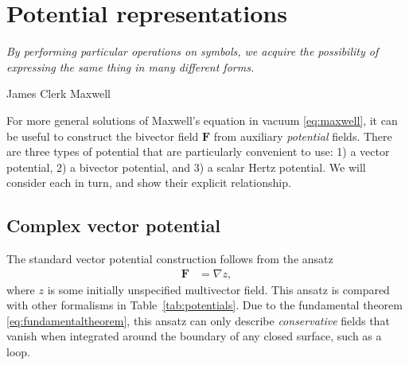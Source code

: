 \documentclass[1p,sort&compress]{elsarticle}
\numberwithin{equation}{section}
\newcommand{\bv}[1]{\mathbf{#1}}
\newcommand\epigraph[3]{
\vspace{1em}\hfill{}\begin{minipage}{#1}{\begin{spacing}{0.9}
\small\noindent\textit{#2}\end{spacing}
\vspace{1em}
\hfill{}{#3}}\vspace{2em}
\end{minipage}}
\begin{document}

\section{Potential representations}\label{sec:potentials}


\epigraph{4.5in}{By performing particular operations on symbols, we acquire the possibility of expressing the same thing in many different forms.}{James Clerk Maxwell \cite{Maxwell1870}}


For more general solutions of Maxwell's equation in vacuum \eqref{eq:maxwell}, it can be useful to construct the bivector field $\bv{F}$ from auxiliary \emph{potential} fields.  There are three types of potential that are particularly convenient to use: 1) a vector potential, 2) a bivector potential, and 3) a scalar Hertz potential.  We will consider each in turn, and show their explicit relationship.


\subsection{Complex vector potential}


The standard vector potential construction follows from the ansatz
\begin{align}\label{eq:potential}
  \bv{F} &= \nabla z,
\end{align}
where $z$ is some initially unspecified multivector field.  This ansatz is compared with other formalisms in Table~\ref{tab:potentials}.  Due to the fundamental theorem \eqref{eq:fundamentaltheorem}, this ansatz can only describe \emph{conservative} fields that vanish when integrated around the boundary of any closed surface, such as a loop.  
\end{document}
